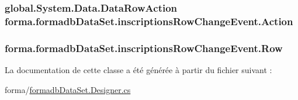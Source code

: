 \subsubsection[{\texorpdfstring{Action}{Action}}]{\setlength{\rightskip}{0pt plus 5cm}global.\+System.\+Data.\+Data\+Row\+Action forma.\+formadb\+Data\+Set.\+inscriptions\+Row\+Change\+Event.\+Action\hspace{0.3cm}{\ttfamily [get]}}\hypertarget{classforma_1_1formadb_data_set_1_1inscriptions_row_change_event_ad4148ad7b1135c523f1f8ae42ae941f6}{}\label{classforma_1_1formadb_data_set_1_1inscriptions_row_change_event_ad4148ad7b1135c523f1f8ae42ae941f6}
\subsubsection[{\texorpdfstring{Row}{Row}}]{ forma.\+formadb\+Data\+Set.\+inscriptions\+Row\+Change\+Event.\+Row\hspace{0.3cm}{\ttfamily [get]}}\hypertarget{classforma_1_1formadb_data_set_1_1inscriptions_row_change_event_a4556346c22c9696250e4141018baac72}{}\label{classforma_1_1formadb_data_set_1_1inscriptions_row_change_event_a4556346c22c9696250e4141018baac72}


La documentation de cette classe a été générée à partir du fichier suivant \+:\begin{DoxyCompactItemize}
\item 
forma/\hyperlink{formadb_data_set_8_designer_8cs}{formadb\+Data\+Set.\+Designer.\+cs}\end{DoxyCompactItemize}
